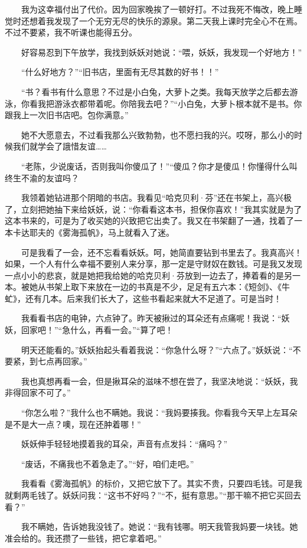  　　我为这幸福付出了代价。因为回家晚挨了一顿好打。不过我死不悔改，晚上睡觉时还想着我发现了一个无穷无尽的快乐的源泉。第二天我上课时完全心不在焉。不过不要紧，我不听课也能得五分。 
 
 　　好容易忍到下午放学，我找到妖妖对她说：“喂，妖妖，我发现一个好地方！” 
 
 　　“什么好地方？”“旧书店，里面有无尽其数的好书！！” 
 
 　　“书？看书有什么意思？不过是小白兔，大萝卜之类。我每天放学之后都去游泳，你看我把游泳衣都带着呢。你陪我去吧？”“小白兔，大萝卜根本就不是书。你跟我上一次旧书店吧。包你满意。” 
 
 　　她不大愿意去，不过看我那么兴致勃勃，也不愿扫我的兴。哎呀，那么小的时候我们就学会了誐惜友谊…… 
 
 　　“老陈，少说废话，否则我叫你傻瓜了！”“傻瓜？你才是傻瓜！你懂得什么叫终生不渝的友谊吗？ 
 
 　　我领着她钻进那个阴暗的书店。我看见“哈克贝利·芬”还在书架上，高兴极了，立刻把她抽下来给妖妖，说：“你看看这本书，担保你喜欢！”我其实就是为了这本书来的，可是为了收买她的兴致把它出卖了。我又在书架翻了一通，找着了一本卡达耶夫的《雾海孤帆》，马上就看入了迷。 
 
 　　可是我看了一会，还不忘看看妖妖。呵，她简直要钻到书里去了。我真高兴！如果，一个人有什么幸福不要别人来分享，那一定是守财奴在数钱。可是我又发现一点小小的悲哀，就是她把我给她的哈克贝利·芬放到一边去了，捧着看的是另一本。被她从书架上取下来放在一边的书真是不少，足足有五六本：《短剑》、《牛虻》，还有几本。后来我们长大了，这些书看起来就大不足道了。可是当时！ 
 
 　　我看看书店的电钟，六点钟了。昨天被揪过的耳朵还有点痛呢！我说：“妖妖，回家吧！”“急什么，再看一会。”“算了吧！ 
 
 　　明天还能看的。”妖妖抬起头看着我说：“你急什么呀？”“六点了。”妖妖说：“不要紧，到七点再回家。” 
 
 　　我也真想再看一会，但是揪耳朵的滋味不想在尝了，我坚决地说：“妖妖，我非得回家不可了。” 
 
 　　“你怎么啦？”我什么也不瞒她。我说：“我妈要揍我。你看我今天早上左耳朵是不是大一点？噢，现在还肿着哪！” 
 
 　　妖妖伸手轻轻地摸着我的耳朵，声音有点发抖：“痛吗？” 
 
 　　“废话，不痛我也不着急走了。”“好，咱们走吧。” 
 
 　　我看看《雾海孤帆》的标价，又把它放下了。其实不贵，只要四毛钱。可是我就剩两毛钱了。妖妖问我：“这书不好吗？”“不，挺有意思。”“那干嘛不把它买回去看？” 
 
 　　我不瞒她，告诉她我没钱了。她说：“我有钱哪。明天我管我妈要一块钱。她准会给的。我还攒了一些钱，把它拿着吧。” 
 
